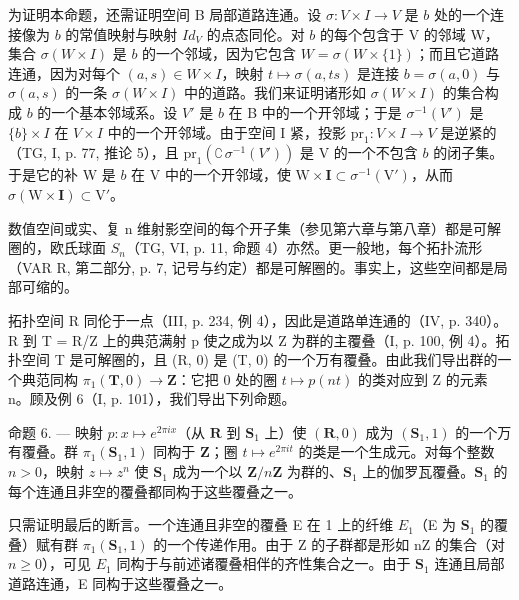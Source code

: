 为证明本命题，还需证明空间 B 局部道路连通。设 \(\sigma: V \times I \to V\) 是 \(b\) 处的一个连接像为 \(b\) 的常值映射与映射 \(Id_V\) 的点态同伦。对 \(b\) 的每个包含于 V 的邻域 W，集合 \(\sigma(W \times I)\) 是 \(b\) 的一个邻域，因为它包含 \(W = \sigma(W \times \{1\})\)；而且它道路连通，因为对每个 \((a, s) \in W \times I\)，映射 \(t \mapsto \sigma(a, ts)\) 是连接 \(b = \sigma(a, 0)\) 与 \(\sigma(a, s)\) 的一条 \(\sigma(W \times I)\) 中的道路。我们来证明诸形如 \(\sigma(W \times I)\) 的集合构成 \(b\) 的一个基本邻域系。设 \(V'\) 是 \(b\) 在 B 中的一个开邻域；于是 \(\sigma^{-1}(V')\) 是 \(\{b\} \times I\) 在 \(V \times I\) 中的一个开邻域。由于空间 I 紧，投影 \(\mathrm{pr}_1: V \times I \to V\) 是逆紧的（TG, I, p. 77, 推论 5），且 \(\mathrm{pr}_1(\complement\,\sigma^{-1}(V'))\) 是 V 的一个不包含 \(b\) 的闭子集。于是它的补 W 是 \(b\) 在 V 中的一个开邻域，使 \(\mathrm{W} \times \mathbf{I} \subset \sigma^{-1}(\mathrm{V}')\)，从而 \(\sigma(\mathrm{W} \times \mathbf{I}) \subset \mathrm{V}'\)。

数值空间或实、复 n 维射影空间的每个开子集（参见第六章与第八章）都是可解圈的，欧氏球面 \(S_{n}\)（TG, VI, p. 11, 命题 4）亦然。更一般地，每个拓扑流形（VAR R, 第二部分, p. 7, 记号与约定）都是可解圈的。事实上，这些空间都是局部可缩的。


拓扑空间 R 同伦于一点（III, p. 234, 例 4），因此是道路单连通的（IV, p. 340）。R 到 T = R/Z 上的典范满射 p 使之成为以 Z 为群的主覆叠（I, p. 100, 例 4）。拓扑空间 T 是可解圈的，且 (R, 0) 是 (T, 0) 的一个万有覆叠。由此我们导出群的一个典范同构 \(\pi_{1}(\mathbf{T}, 0) \to \mathbf{Z}\)：它把 0 处的圈 \(t \mapsto p(nt)\) 的类对应到 Z 的元素 n。顾及例 6（I, p. 101），我们导出下列命题。

命题 6. --- 映射 \(p \colon x \mapsto e^{2\pi ix}\)（从 \(\mathbf{R}\) 到 \(\mathbf{S}_1\) 上）使 \((\mathbf{R}, 0)\) 成为 \((\mathbf{S}_1, 1)\) 的一个万有覆叠。群 \(\pi_1(\mathbf{S}_1, 1)\) 同构于 \(\mathbf{Z}\)；圈 \(t \mapsto e^{2\pi it}\) 的类是一个生成元。对每个整数 \(n > 0\)，映射 \(z \mapsto z^n\) 使 \(\mathbf{S}_1\) 成为一个以 \(\mathbf{Z}/n\mathbf{Z}\) 为群的、\(\mathbf{S}_1\) 上的伽罗瓦覆叠。\(\mathbf{S}_1\) 的每个连通且非空的覆叠都同构于这些覆叠之一。

只需证明最后的断言。一个连通且非空的覆叠 E 在 1 上的纤维 \(E_{1}\)（E 为 \(\mathbf{S}_{1}\) 的覆叠）赋有群 \(\pi_{1}(\mathbf{S}_{1},1)\) 的一个传递作用。由于 Z 的子群都是形如 nZ 的集合（对 \(n \geqslant 0\)），可见 \(E_{1}\) 同构于与前述诸覆叠相伴的齐性集合之一。由于 \(\mathbf{S}_{1}\) 连通且局部道路连通，E 同构于这些覆叠之一。

